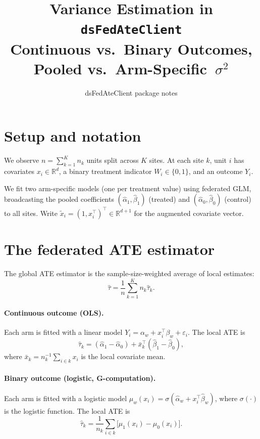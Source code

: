 \documentclass[11pt, a4paper]{article}
\title{Variance Estimation in \texttt{dsFedAteClient}\\[0.4em]
       \large Continuous vs.\ Binary Outcomes, Pooled vs.\ Arm-Specific~$\sigma^2$}
\author{dsFedAteClient package notes}
\date{}
\newcommand{\R}{\mathbb{R}}
\newcommand{\xt}{\tilde{x}}
\newcommand{\hbeta}{\hat{\beta}}
\newcommand{\halpha}{\hat{\alpha}}
\newcommand{\htau}{\hat{\tau}}
\begin{document}
\maketitle
\tableofcontents
\bigskip

\section{Setup and notation}

We observe $n = \sum_{k=1}^K n_k$ units split across $K$ sites.
At each site $k$, unit $i$ has covariates $x_i \in \R^d$, a binary treatment
indicator $W_i \in \{0,1\}$, and an outcome $Y_i$.

We fit two arm-specific models (one per treatment value) using federated GLM,
broadcasting the pooled coefficients
$(\halpha_1,\hbeta_1)$ (treated) and $(\halpha_0,\hbeta_0)$ (control)
to all sites.  Write $\xt_i = (1, x_i^\top)^\top \in \R^{d+1}$ for the
augmented covariate vector.

\section{The federated ATE estimator}

The global ATE estimator is the sample-size-weighted average of local estimates:
\begin{equation}\label{eq:ate}
  \htau = \frac{1}{n}\sum_{k=1}^K n_k \htau_k.
\end{equation}

\paragraph{Continuous outcome (OLS).}
Each arm is fitted with a linear model $Y_i = \alpha_w + x_i^\top\beta_w + \varepsilon_i$.
The local ATE is
\begin{equation}\label{eq:tau_cont}
  \htau_k = (\halpha_1 - \halpha_0) + \bar{x}_k^\top(\hbeta_1 - \hbeta_0),
\end{equation}
where $\bar{x}_k = n_k^{-1}\sum_{i \in k} x_i$ is the local covariate mean.

\paragraph{Binary outcome (logistic, G-computation).}
Each arm is fitted with a logistic model
$\mu_w(x_i) = \sigma(\halpha_w + x_i^\top\hbeta_w)$,
where $\sigma(\cdot)$ is the logistic function.
The local ATE is
\begin{equation}\label{eq:tau_bin}
  \htau_k = \frac{1}{n_k}\sum_{i \in k}\bigl[\mu_1(x_i) - \mu_0(x_i)\bigr].
\end{equation}
\end{document}
